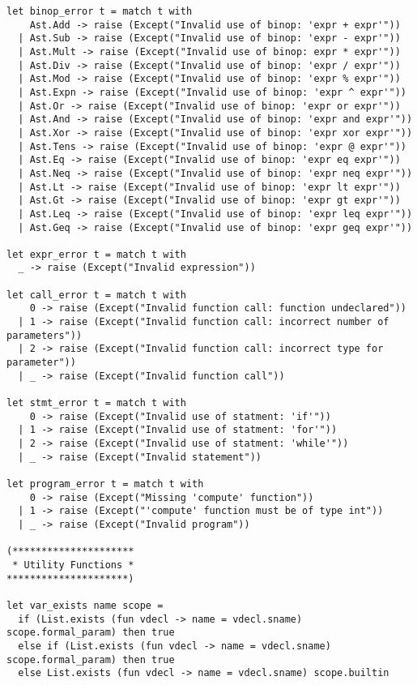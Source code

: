 \begin{lstlisting}
let binop_error t = match t with
    Ast.Add -> raise (Except("Invalid use of binop: 'expr + expr'"))
  | Ast.Sub -> raise (Except("Invalid use of binop: 'expr - expr'"))
  | Ast.Mult -> raise (Except("Invalid use of binop: expr * expr'"))
  | Ast.Div -> raise (Except("Invalid use of binop: 'expr / expr'"))
  | Ast.Mod -> raise (Except("Invalid use of binop: 'expr % expr'"))
  | Ast.Expn -> raise (Except("Invalid use of binop: 'expr ^ expr'"))
  | Ast.Or -> raise (Except("Invalid use of binop: 'expr or expr'"))
  | Ast.And -> raise (Except("Invalid use of binop: 'expr and expr'"))
  | Ast.Xor -> raise (Except("Invalid use of binop: 'expr xor expr'"))
  | Ast.Tens -> raise (Except("Invalid use of binop: 'expr @ expr'"))
  | Ast.Eq -> raise (Except("Invalid use of binop: 'expr eq expr'"))
  | Ast.Neq -> raise (Except("Invalid use of binop: 'expr neq expr'"))
  | Ast.Lt -> raise (Except("Invalid use of binop: 'expr lt expr'"))
  | Ast.Gt -> raise (Except("Invalid use of binop: 'expr gt expr'"))
  | Ast.Leq -> raise (Except("Invalid use of binop: 'expr leq expr'"))
  | Ast.Geq -> raise (Except("Invalid use of binop: 'expr geq expr'"))

let expr_error t = match t with
  _ -> raise (Except("Invalid expression"))

let call_error t = match t with
    0 -> raise (Except("Invalid function call: function undeclared"))
  | 1 -> raise (Except("Invalid function call: incorrect number of parameters"))
  | 2 -> raise (Except("Invalid function call: incorrect type for parameter"))
  | _ -> raise (Except("Invalid function call"))

let stmt_error t = match t with
    0 -> raise (Except("Invalid use of statment: 'if'"))
  | 1 -> raise (Except("Invalid use of statment: 'for'"))
  | 2 -> raise (Except("Invalid use of statment: 'while'"))
  | _ -> raise (Except("Invalid statement"))

let program_error t = match t with
    0 -> raise (Except("Missing 'compute' function"))
  | 1 -> raise (Except("'compute' function must be of type int"))
  | _ -> raise (Except("Invalid program"))

(*********************
 * Utility Functions *
*********************)

let var_exists name scope =
  if (List.exists (fun vdecl -> name = vdecl.sname) scope.formal_param) then true
  else if (List.exists (fun vdecl -> name = vdecl.sname) scope.formal_param) then true
  else List.exists (fun vdecl -> name = vdecl.sname) scope.builtin


\end{lstlisting}
